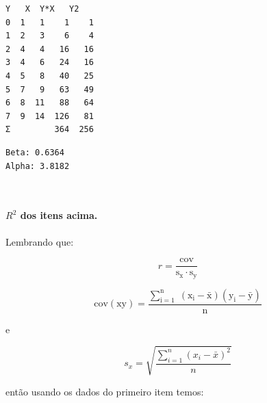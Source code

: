 \documentclass[11pt]{article}
\begin{document}
    
    \begin{Verbatim}[commandchars=\\\{\}]
   Y   X  Y*X   Y2
0  1   1    1    1
1  2   3    6    4
2  4   4   16   16
3  4   6   24   16
4  5   8   40   25
5  7   9   63   49
6  8  11   88   64
7  9  14  126   81
Σ         364  256
    \end{Verbatim}

    
    \begin{Verbatim}[commandchars=\\\{\}]
Beta: 0.6364
Alpha: 3.8182
    \end{Verbatim}

    \begin{center}
    \end{center}
    { \hspace*{\fill} \\}
    
    \paragraph{\texorpdfstring{\(R^2\) dos itens
acima.}{R\^{}2 dos itens acima.}}\label{r2-dos-itens-acima.}

Lembrando que:

\[
r = \mathrm{\frac{cov}{s_x\cdot s_y}}
\]

\[
\mathrm{cov(xy)=\frac{\displaystyle\sum_{i=1}^n\;(x_i-\bar{x})(y_i - \bar{y})}{n}}
\]

e

\[
{s_x=\sqrt{\frac{\displaystyle\sum_{i=1}^n(x_i - \bar{x})^2}{n}}}
\]

então usando os dados do primeiro item temos:
\end{document}
